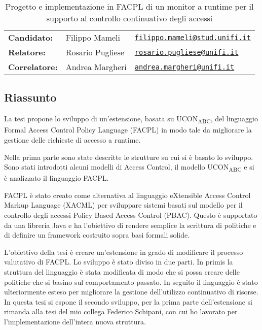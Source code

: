 \documentclass[10pt]{article}
\begin{document}
\begin{table}[]
\centering
\caption*{Progetto e implementazione in FACPL di un monitor a runtime per il supporto al controllo continuativo degli accessi}
\begin{tabular}{lll}
\textbf{Candidato:}   & Filippo Mameli & \href{mailto:filippo.mameli@stud.unifi.it}{\texttt{filippo.mameli@stud.unifi.it}}  \\
\textbf{Relatore:}    & Rosario Pugliese  & \href{mailto:rosario.pugliese@unifi.it}{\texttt{rosario.pugliese@unifi.it}}                           \\
\textbf{Correlatore:} & Andrea Margheri   & \href{mailto:andrea.margheri@unifi.it}{\texttt{andrea.margheri@unifi.it}}
\end{tabular}
\end{table}
\subsection*{Riassunto}
La tesi propone lo sviluppo di un'estensione, basata su UCON\textsubscript{ABC}, del linguaggio
Formal Access Control Policy Language (FACPL)
in modo tale da migliorare la gestione delle richieste di accesso a runtime.

Nella prima parte sono state descritte le strutture su cui si è basato lo sviluppo. Sono stati introdotti alcuni
modelli di Access Control, il modello UCON\textsubscript{ABC} e si è analizzato il linguaggio FACPL.

FACPL è stato creato come alternativa al linguaggio
eXtensible Access Control Markup Language (XACML) per sviluppare sistemi basati sul modello per il controllo degli
accessi Policy Based Access Control (PBAC). Questo è supportato da una libreria Java e ha l'obiettivo di rendere semplice
la scrittura di politiche e di definire un framework costruito sopra basi formali solide.

L'obiettivo della tesi è creare un'estensione in grado di modificare il processo valutativo di FACPL.
Lo sviluppo è stato diviso in due parti. In primis la struttura del linguaggio è stata modificata di modo
che si possa creare delle politiche che si basino sul comportamento passato. In seguito il linguaggio
è stato ulteriormente esteso per migliorare la gestione dell'utilizzo continuativo di risorse.
In questa tesi si espone il secondo sviluppo, per la prima parte dell'estensione si rimanda
alla tesi del mio collega Federico Schipani, con cui ho lavorato per l'implementazione dell'intera nuova struttura.
\end{document}
